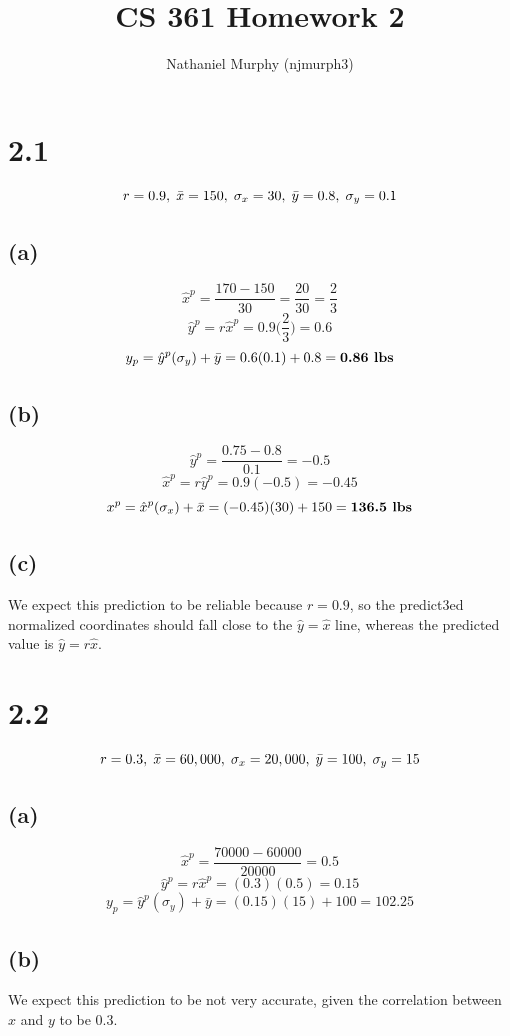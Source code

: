 \documentclass[11pt]{article}
\title{\textbf{CS 361 Homework 2}}
\author{Nathaniel Murphy (njmurph3)}
\date{}
\begin{document}
\maketitle

\section*{2.1}
\[r=0.9,\hspace{1mm}\bar{x} = 150,\hspace{1mm}\sigma_x=30,\hspace{1mm}\bar{y}=0.8,\hspace{1mm}\sigma_y=0.1\]
\subsection*{(a)}
\[\hat{x}^p=\frac{170-150}{30}=\frac{20}{30}=\frac{2}{3}\]
\[\hat{y}^p=r\hat{x}^p=0.9\Big(\frac{2}{3}\Big)=0.6\]
\[y_p=\hat{y}^p(\sigma_y)+\bar{y}=0.6(0.1)+0.8=\textbf{0.86\text{ lbs}}\]
\subsection*{(b)}
\[\hat{y}^p=\frac{0.75-0.8}{0.1}=-0.5\]
\[\hat{x}^p=r\hat{y}^p=0.9(-0.5)=-0.45\]
\[x^p=\hat{x}^p(\sigma_x)+\bar{x}=(-0.45)(30)+150=\textbf{136.5\text{ lbs}}\]
\subsection*{(c)}
We expect this prediction to be reliable because $r=0.9$, so the predict3ed normalized coordinates should fall close to the $\hat{y}=\hat{x}$ line, whereas the predicted value is $\hat{y}=r\hat{x}$.
\clearpage
\section*{2.2}
\[r=0.3,\hspace{1mm}\bar{x}=60,000,\hspace{1mm}\sigma_x=20,000,\hspace{1mm}\bar{y}=100,\hspace{1mm}\sigma_y=15\]
\subsection*{(a)}
\[\hat{x}^p=\frac{70000-60000}{20000}=0.5\]
\[\hat{y}^p=r\hat{x}^p=(0.3)(0.5)=0.15\]
\[y_p=\hat{y}^p(\sigma_y)+\bar{y}=(0.15)(15)+100=102.25\]
\subsection*{(b)}
We expect this prediction to be not very accurate, given the correlation between $x$ and $y$ to be 0.3.
\end{document}
